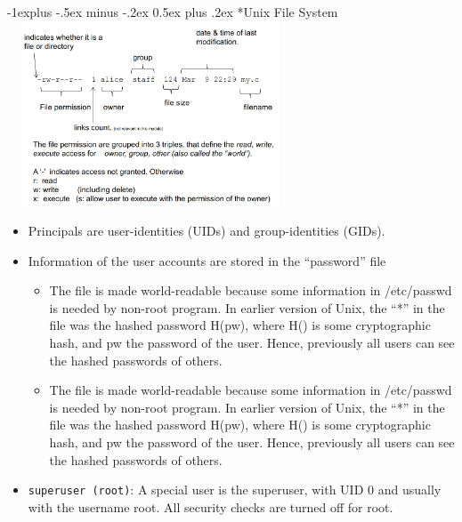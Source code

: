 \documentclass[10pt,landscape]{article}
\makeatletter
\renewcommand{\subsection}{\@startsection{subsection}{2}{0mm}%
                                {-1explus -.5ex minus -.2ex}%
                                {0.5ex plus .2ex}%
                                {\normalfont\normalsize\bfseries}}
\makeatother
\begin{document}
\begin{multicols*}{3}
\subsection*{Unix File System}
\includegraphics[width=8.5cm, height=5.5cm]{images/unixfilesystempermission.png}
\begin{itemize}[noitemsep,wide=0pt, leftmargin=\dimexpr{} + 2\relax]
    \item Principals are user-identities (UIDs) and group-identities (GIDs).
    \item Information of the user accounts are stored in the “password” file
    \begin{itemize}[noitemsep,wide=0pt, leftmargin=\dimexpr{} + 2\relax]
        \item The file is made world-readable because some information in /etc/passwd is
        needed by non-root program. In earlier version of Unix, the “*” in the file was the
        hashed password H(pw), where H() is some cryptographic hash, and pw the
        password of the user. Hence, previously all users can see the hashed passwords
        of others.
        \item The file is made world-readable because some information in /etc/passwd is
        needed by non-root program. In earlier version of Unix, the “*” in the file was the
        hashed password H(pw), where H() is some cryptographic hash, and pw the
        password of the user. Hence, previously all users can see the hashed passwords
        of others.
    \end{itemize}
    \item \verb|superuser (root)|: A special user is the superuser, with UID 0 and usually with the username root.
    All security checks are turned off for root.
\end{itemize}


\end{multicols*}
\end{document}
